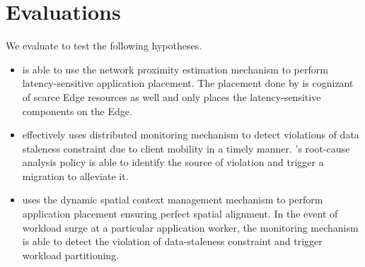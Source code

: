 \section{Evaluations}
\label{sec:oneedge_evals}
We evaluate \oneedge{} to test the following hypotheses.
\begin{itemize}
\item \oneedge{} is able to use the network proximity estimation mechanism to perform latency-sensitive application placement. The placement done by \oneedge{} is cognizant of scarce Edge resources as well and only places the latency-sensitive components on the Edge.
\item \oneedge{} effectively uses distributed monitoring mechanism to detect violations of data staleness constraint due to client mobility in a timely manner. \oneedge{}'s root-cause analysis policy is able to identify the source of violation and trigger a migration to alleviate it.
\item \oneedge{} uses the dynamic spatial context management mechanism to perform application placement ensuring perfect spatial alignment. In the event of workload surge at a particular application worker, the monitoring mechanism is able to detect the violation of data-staleness constraint and trigger workload partitioning. 
\end{itemize}

